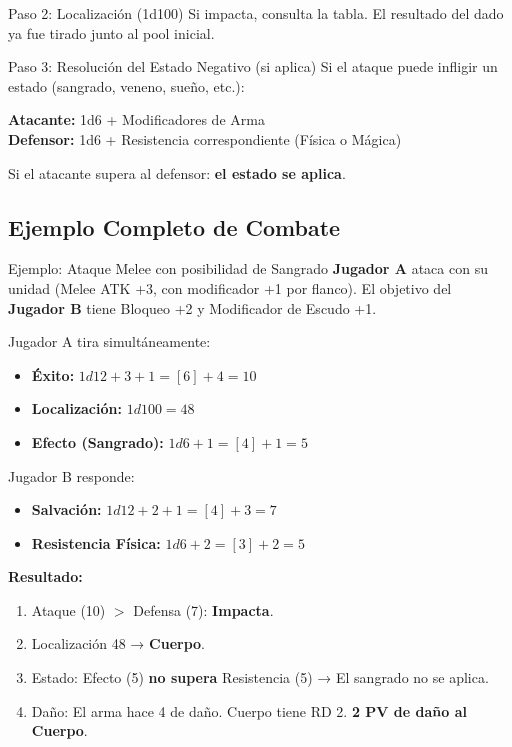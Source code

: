 \begin{reglaespecial}{Paso 2: Localización (1d100)}
Si impacta, consulta la tabla. El resultado del dado ya fue tirado junto al pool inicial.
\end{reglaespecial}

\begin{reglaespecial}{Paso 3: Resolución del Estado Negativo (si aplica)}
Si el ataque puede infligir un estado (sangrado, veneno, sueño, etc.):

\textbf{Atacante:} 1d6 + Modificadores de Arma\\
\textbf{Defensor:} 1d6 + Resistencia correspondiente (Física o Mágica)

Si el atacante supera al defensor: \textbf{el estado se aplica}.
\end{reglaespecial}

\subsection*{Ejemplo Completo de Combate}

\begin{ejemplo}{Ejemplo: Ataque Melee con posibilidad de Sangrado}
\textbf{Jugador A} ataca con su unidad (Melee ATK +3, con modificador +1 por flanco). El objetivo del \textbf{Jugador B} tiene Bloqueo +2 y Modificador de Escudo +1.

Jugador A tira simultáneamente:
\begin{itemize}
    \item \textbf{Éxito:} $1d12 + 3 + 1 = [6] + 4 = 10$
    \item \textbf{Localización:} $1d100 = 48$
    \item \textbf{Efecto (Sangrado):} $1d6 + 1 = [4] + 1 = 5$
\end{itemize}
Jugador B responde:
\begin{itemize}
    \item \textbf{Salvación:} $1d12 + 2 + 1 = [4] + 3 = 7$
    \item \textbf{Resistencia Física:} $1d6 + 2 = [3] + 2 = 5$
\end{itemize}
\textbf{Resultado:}
\begin{enumerate}
    \item Ataque (10) $>$ Defensa (7): \textbf{Impacta}.
    \item Localización 48 → \textbf{Cuerpo}.
    \item Estado: Efecto (5) \textbf{no supera} Resistencia (5) → El sangrado no se aplica.
    \item Daño: El arma hace 4 de daño. Cuerpo tiene RD 2. \textbf{2 PV de daño al Cuerpo}.
\end{enumerate}
\end{ejemplo}

